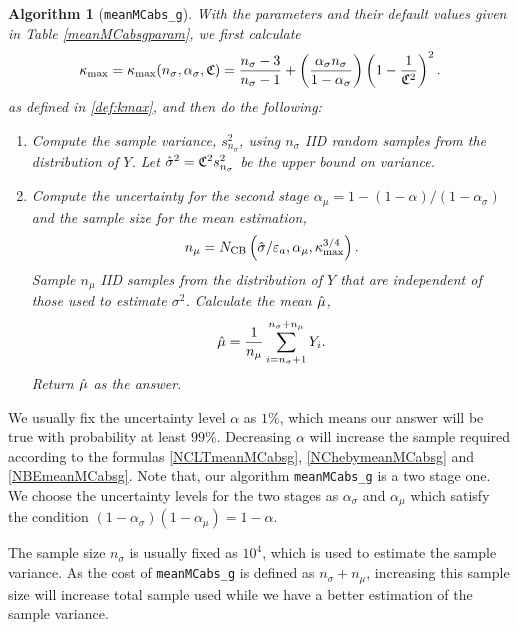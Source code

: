 \documentclass{iitthesis}
\newtheorem{algorithm}[theorem]{Algorithm}
\theoremstyle{definition}
\begin{document}
\begin{algorithm}[{\tt meanMCabs\_g}]
With the parameters and their default values given in Table \ref{meanMCabsgparam}, we first calculate 
\begin{equation}	\label{kmaxinalg}
\kappa_{\max}=\kappa_{\max}(n_\sigma,\alpha_\sigma,\mathfrak{C}) =\frac{n_\sigma-3}{n_\sigma-1} + \left(\frac{ \alpha_\sigma n_\sigma}{1-\alpha_\sigma}\right) \left(1 - \frac{1}{\mathfrak{C}^2}\right)^2.
\end{equation}
as defined in \eqref{def:kmax}, and then do the following:
\begin{enumerate}
\item Compute the sample variance, $s^2_{n_{\sigma}}$, using $n_\sigma$ IID random samples from the distribution of  $Y$. Let $\hat{\sigma}^2 = \mathfrak{C}^2 s^2_{n_\sigma}$ be the upper bound on variance.
\item Compute the uncertainty for the second stage $\alpha_\mu = 1-(1-\alpha)/(1-\alpha_{\sigma})$ and the sample size for the mean estimation,
\begin{align}\label{def:meanmcabsgnmu}
n_\mu = N_{\operatorname{CB}} \left(\hat{\sigma}/\varepsilon_a,\alpha_\mu, \kappa_{\max}^{3/4}\right).
\end{align}
Sample $n_\mu$ IID samples from the distribution of $Y$ that are independent of those used to estimate $\sigma^2$. Calculate the mean $\hat{\mu}$,
\begin{align}\label{def:meanmcabsghmu}
\hat{\mu} = \frac{1}{n_\mu}\sum_{i = n_\sigma+1}^{n_\sigma+n_\mu}Y_i.
\end{align}
Return $\hat{\mu}$ as the answer.
\end{enumerate}

\end{algorithm}

\label{subsec:sensitivityofparameters}
 We usually fix the uncertainty level $\alpha$ as $1\%$, which means our answer will be true with probability at least $99\%$. Decreasing $\alpha$ will increase the sample required according to the formulas \eqref{NCLTmeanMCabsg}, \eqref{NChebymeanMCabsg} and \eqref{NBEmeanMCabsg}. Note that, our algorithm {\tt meanMCabs\_g} is a two stage one. We choose the uncertainty levels for the two stages as $\alpha_\sigma$ and $\alpha_\mu$ which satisfy the condition $(1-\alpha_\sigma)(1-\alpha_\mu)=1-\alpha$.

The sample size $n_\sigma$ is usually fixed as $10^4$, which is used to estimate the sample variance. As the cost of {\tt meanMCabs\_g} is defined as $n_\sigma +n_\mu$, increasing this sample size will increase total sample used while we have a better estimation of the sample variance. 
\end{document}
